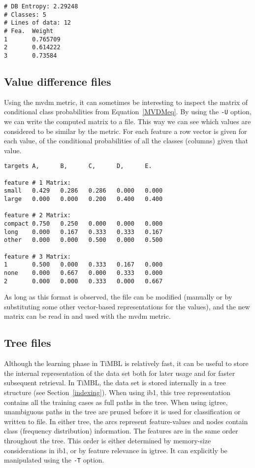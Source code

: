 \documentclass{report}
\begin{document}
\begin{footnotesize}
\begin{verbatim}
# DB Entropy: 2.29248
# Classes: 5
# Lines of data: 12
# Fea.  Weight
1       0.765709
2       0.614222
3       0.73584
\end{verbatim}
\end{footnotesize}

\subsection{Value difference files}
\label{mvdmformat}

Using the {\sc mvdm} metric, it can sometimes be interesting to
inspect the matrix of conditional class probabilities from
Equation~\ref{MVDMeq}. By using the {\tt -U} option, we can write the
computed matrix to a file. This way we can see which values are
considered to be similar by the metric. For each feature a row vector
is given for each value, of the conditional probabilities of all the
classes (columns) given that value.

\begin{footnotesize}
\begin{verbatim}
targets A,      B,      C,      D,      E.

feature # 1 Matrix: 
small   0.429   0.286   0.286   0.000   0.000
large   0.000   0.000   0.200   0.400   0.400
 
feature # 2 Matrix: 
compact 0.750   0.250   0.000   0.000   0.000
long    0.000   0.167   0.333   0.333   0.167
other   0.000   0.000   0.500   0.000   0.500
 
feature # 3 Matrix: 
1       0.500   0.000   0.333   0.167   0.000
none    0.000   0.667   0.000   0.333   0.000
2       0.000   0.000   0.333   0.000   0.667
\end{verbatim}
\end{footnotesize}

As long as this format is observed, the file can be modified (manually
or by substituting some other vector-based representations for the
values), and the new matrix can be read in and used with the {\sc
mvdm} metric.

\subsection{Tree files}
\label{treeformat}

Although the learning phase in TiMBL is relatively fast, it can be
useful to store the internal representation of the data set both for
later usage and for faster subsequent retrieval. In TiMBL, the data
set is stored internally in a tree structure (see
Section~\ref{indexing}). When using {\sc ib1}, this tree
representation contains all the training cases as full paths in the
tree. When using {\sc igtree}, unambiguous paths in the tree are
pruned before it is used for classification or written to file. In
either tree, the arcs represent feature-values and nodes contain class
(frequency distribution) information. The features are in the same
order throughout the tree. This order is either determined by
memory-size considerations in {\sc ib1}, or by feature relevance in
{\sc igtree}. It can explicitly be manipulated using the {\tt -T}
option.
\end{document}
